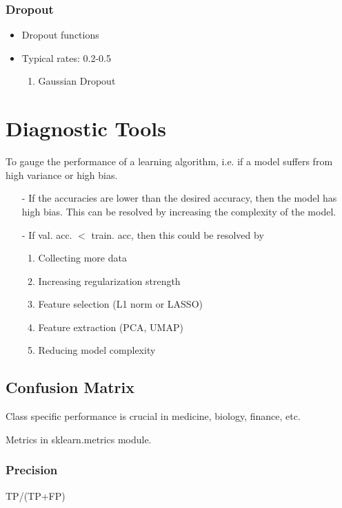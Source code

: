 \documentclass[a4paper, 12pt]{report}
\begin{document}
\subsection{Dropout}
\begin{itemize}
\item Dropout functions
\item Typical rates: 0.2-0.5
\begin{enumerate}
\item Gaussian Dropout
\end{enumerate}
\end{itemize}



\chapter{Diagnostic Tools}
To gauge the performance of a learning algorithm, i.e. if a model suffers from high variance or high bias.
\begin{itemize}


\item[-] If the accuracies are lower than the desired accuracy, then the model has high bias. This can be resolved by increasing the complexity of the model.

\item[-] If val. acc. $<$ train. acc, then this could be resolved by
\begin{enumerate}
\item Collecting more data
\item Increasing regularization strength
\item Feature selection (L1 norm or LASSO)
\item Feature extraction (PCA, UMAP)
\item Reducing model complexity
\end{enumerate}

\end{itemize}

\section{Confusion Matrix}
Class specific performance is crucial in medicine, biology, finance, etc.

Metrics in sklearn.metrics module.

\subsection{Precision}
TP/(TP+FP)
\end{document}
